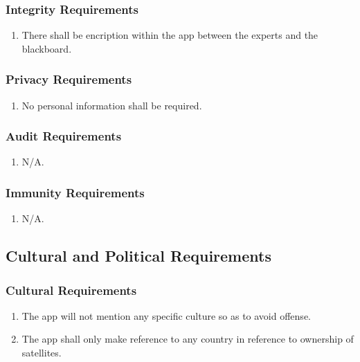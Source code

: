 \documentclass[]{article}
\begin{document}
\begin{enumerate}[{VP}1.]
\subsubsection{Integrity Requirements}
\label{ssub:integrity_requirements}
\begin{enumerate}[{SR}1. ]
	\item There shall be encription within the app between the experts and the blackboard.
\end{enumerate}

\subsubsection{Privacy Requirements}
\label{ssub:privacy_requirements}
\begin{enumerate}[{SR}1. ]
	\item No personal information shall be required.
\end{enumerate}

\subsubsection{Audit Requirements}
\label{ssub:audit_requirements}
\begin{enumerate}[{SR}1. ]
	\item N/A.
\end{enumerate}

\subsubsection{Immunity Requirements}
\label{ssub:immunity_requirements}
\begin{enumerate}[{SR}1. ]
	\item N/A.
\end{enumerate}


\subsection{Cultural and Political Requirements}
\label{sub:cultural_and_political_requirements}

\subsubsection{Cultural Requirements}
\label{ssub:cultural_requirements}
\begin{enumerate}[{CP}1. ]
	\item The app will not mention any specific culture so as to avoid offense.
	\item The app shall only make reference to any country in reference to ownership of satellites.
\end{enumerate}


\end{enumerate}
\end{document}
